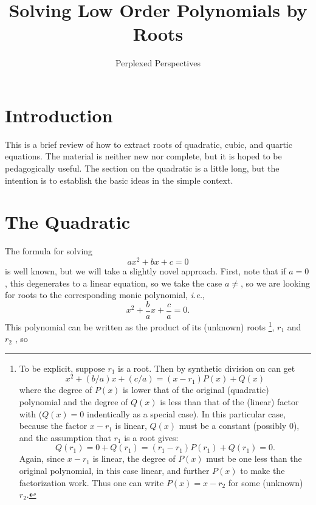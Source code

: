 \documentclass{article}
\title{Solving Low Order Polynomials by Roots}
\author{Perplexed Perspectives}
\begin{document}
\maketitle

\section{Introduction}
This is a brief review of how to extract roots of quadratic,
cubic, and quartic equations.  The material is neither new
nor complete, but it is hoped to be pedagogically useful.
The section on the quadratic is a little long, but the
intention is to establish the basic ideas in the simple
context.

\section{The Quadratic}
The formula for solving
\begin{equation}\label{eq:standard-quadratic}
 a x^2 + bx + c = 0
\end{equation}
is well known, but we will take a slightly novel approach.
First, note that if $a=0$, this degenerates to a linear equation,
so we take the case $a\ne$, so we are looking for roots to
the corresponding monic polynomial, \emph{i.e.},
\begin{equation}\label{eq:monic-quadratic}
  x^2 + \frac{b}{a} x + \frac{c}{a} = 0.
\end{equation} 
This polynomial can be written as the product of its (unknown) roots
\footnote{To be explicit, suppose $r_1$ is a root. 
Then by synthetic division on can get 
\begin{equation}
  x^2 + (b/a)x + (c/a) = (x - r_1)P(x) + Q(x)
\end{equation}
where the degree of $P(x)$ is lower that of the original (quadratic)
polynomial and the degree of $Q(x)$
is less than that of the (linear) factor with ($Q(x)=0$ indentically
as a special case).  In this particular case, because the
factor $x-r_1$ is linear, $Q(x)$ must be a constant (possibly $0$),
and the assumption that $r_1$ is a root gives:
\begin{equation}
 Q(r_1) = 0 + Q(r_1) =  (r_1 - r_1)P(r_1) + Q(r_1) = 0.
\end{equation}
Again, since $x-r_1$ is linear, the degree of $P(x)$ must be one
less than the original polynomial, in this case linear, and further
$P(x)$ to make the factorization work.  Thus one can write
$P(x) = x - r_2$ for some (unknown) $r_2$.},
$r_1$ and $r_2$ , so 
\end{document}
